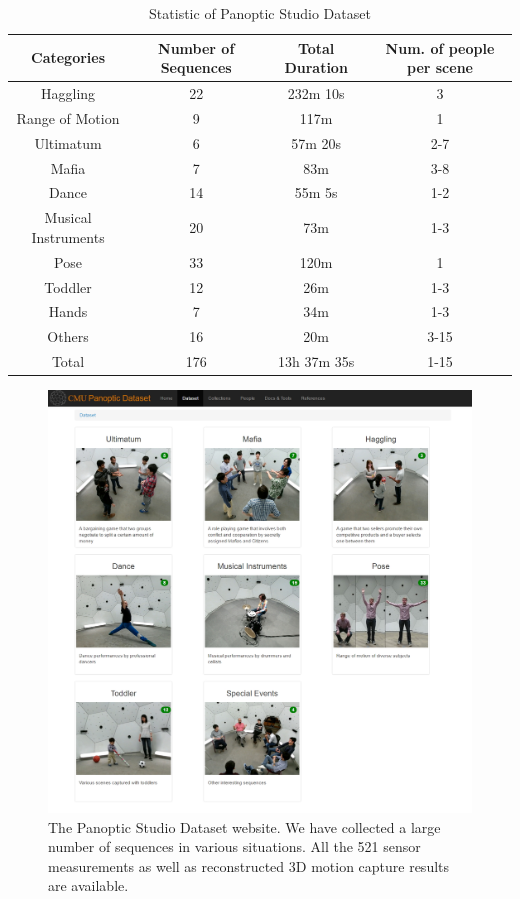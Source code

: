 \begin{table}[h]
	\centering
	\begin{tabular}{c| c | c | c }
		\hline	
		Categories & Number of Sequences  & Total Duration  & Num. of people per scene \\
		\hline	
		Haggling & 22  & 232m 10s  & 3   \\
		\hline	
		Range of Motion &  9 & 117m  & 1   \\
		\hline	
		Ultimatum &  6 & 57m 20s & 2-7   \\
		\hline	
		Mafia &  7 &  83m & 3-8   \\
		\hline	
		Dance&  14& 55m 5s & 1-2   \\
		\hline	
		Musical Instruments& 20 & 73m  & 1-3  \\
		\hline	
		Pose& 33 & 120m  & 1  \\ 
		\hline	
		Toddler& 12 & 26m & 1-3  \\ 
		\hline	
		Hands&  7 &  34m & 1-3  \\ 
		\hline	
		Others& 16 & 20m & 3-15 \\
		\hline	
		\hline	
		Total& 176 & 13h 37m 35s & 1-15\\
		\hline	
	\end{tabular}
	\caption{Statistic of Panoptic Studio Dataset}
	\label{table:dataset}
\end{table}

\begin{figure}
	\centering
	\includegraphics[height=0.95\textwidth]{figures/domedb}
	\caption{The Panoptic Studio Dataset website. We have collected a large number of sequences in various situations. All the 521 sensor measurements as well as reconstructed 3D motion capture results are available.} 
	\label{fig:domedb}
\end{figure}

